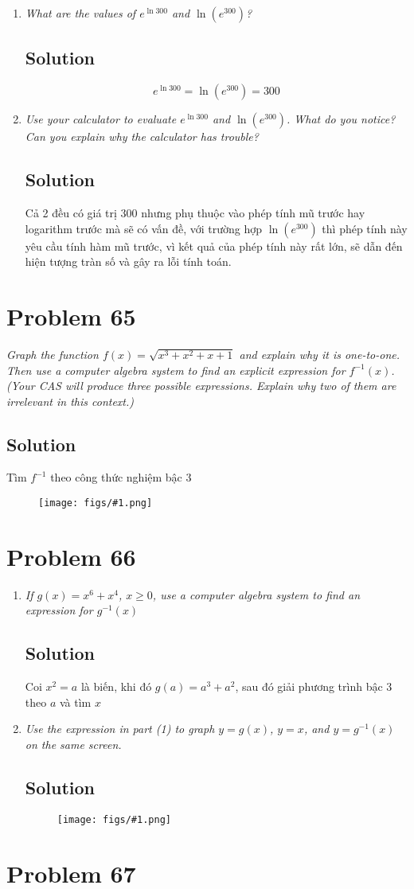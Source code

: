 \documentclass[11pt]{article}
\newcommand{\soln}{\subsection*}
\newcommand{\qn}{\textit}
\newcommand{\imgsoln}[1]{
	\begin{figure}[H]
		\centering
		\texttt{[image: figs/\#1.png]}
	\end{figure}
}
\begin{document}
\begin{enumerate}
	\item \qn{What are the values of $e^{\ln{300}}$ and $\ln(e^{300})$?}
	\soln{Solution}
	$$e^{\ln{300}}=\ln(e^{300})=300$$
	
	\item \qn{Use your calculator to evaluate $e^{\ln{300}}$ and $\ln(e^{300})$. What do you notice? Can you explain why the calculator has trouble?}
	\soln{Solution}
	Cả 2 đều có giá trị 300 nhưng phụ thuộc vào phép tính mũ trước hay logarithm trước mà sẽ có vấn đề, với trường hợp $\ln(e^{300})$ thì phép tính này yêu cầu tính hàm mũ trước, vì kết quả của phép tính này rất lớn, sẽ dẫn đến hiện tượng tràn số và gây ra lỗi tính toán.
\end{enumerate}

\section*{Problem 65}

\qn{Graph the function $f(x)=\sqrt{x^3+x^2+x+1}$ and explain why it is one-to-one. Then use a computer algebra system to find an explicit expression for $f^{-1}(x)$. (Your CAS will produce three possible expressions. Explain why two of them are irrelevant in this context.)}

\soln{Solution}
Tìm $f^{-1}$ theo công thức nghiệm bậc 3
\imgsoln{1.5.65-ans}

\section*{Problem 66}

\begin{enumerate}
	\item \qn{If $g(x)=x^6+x^4$, $x \ge 0$, use a computer algebra system to find an expression for $g^{-1}(x)$}
	\soln{Solution}
	Coi $x^2=a$ là biến, khi đó $g(a)=a^3+a^2$, sau đó giải phương trình bậc 3 theo $a$ và tìm $x$
	
	\item \qn{Use the expression in part (1) to graph $y=g(x)$, $y=x$, and $y=g^{-1}(x)$ on the same screen.}
	\soln{Solution}
	\imgsoln{1.5.66-ans.a}
\end{enumerate}

\section*{Problem 67}
\end{document}
